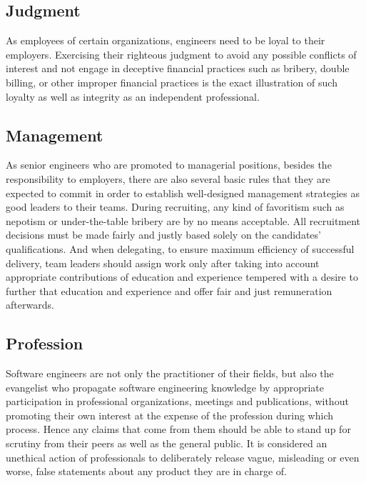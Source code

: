  
 \subsection{Judgment}
 
 As employees of certain organizations, engineers need to be loyal to their employers. Exercising their righteous judgment to avoid any possible conflicts of interest and not engage in deceptive financial practices such as bribery, double billing, or other improper financial practices\cite{Gotterbarn:1999:PST:308769.308770} is  the exact illustration of such loyalty as well as integrity as an independent professional.
 
 
 \subsection{Management}
 
 As senior engineers who are promoted to managerial positions, besides the responsibility to employers, there are also several basic rules that they are expected to commit in order to establish well-designed management strategies as good leaders to their teams. During recruiting, any kind of favoritism such as nepotism or under-the-table bribery  are by no means acceptable. All recruitment decisions must be made fairly and justly based solely on the candidates' qualifications. And when delegating, to ensure maximum efficiency of successful delivery, team leaders should assign work only after taking into account appropriate contributions of education and experience tempered with a desire to further that education and experience and offer fair and just remuneration afterwards\cite{Gotterbarn:1999:PST:308769.308770}.
 
 
 \subsection{Profession}
 
 Software engineers are not only the practitioner of their fields, but also the evangelist who 
 propagate software engineering knowledge by appropriate participation in professional organizations, meetings and publications, without promoting their own interest  at the expense of the profession during which process\cite{Gotterbarn:1999:PST:308769.308770}. Hence any claims that come from them should be able to stand up for scrutiny from their peers as well as the general public. It is considered an unethical action of professionals to deliberately release vague, misleading or even worse, false statements about any product they are in charge of.
 
